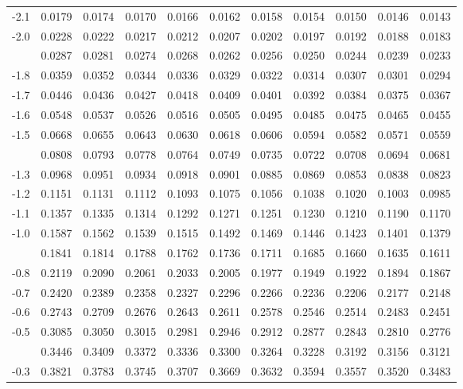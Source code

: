 \documentclass[12pt,a4paper]{article}
\begin{document}
\begin{enumerate}
\begin{center}
\begin{longtable}{ccccccccccc}
-2.1 & 0.0179 & 0.0174 & 0.0170 & 0.0166 & 0.0162 & 0.0158 & 0.0154 & 0.0150 & 0.0146 & 0.0143 \\
-2.0 & 0.0228 & 0.0222 & 0.0217 & 0.0212 & 0.0207 & 0.0202 & 0.0197 & 0.0192 & 0.0188 & 0.0183 \\
\addlinespace
-1.9 & 0.0287 & 0.0281 & 0.0274 & 0.0268 & 0.0262 & 0.0256 & 0.0250 & 0.0244 & 0.0239 & 0.0233 \\
-1.8 & 0.0359 & 0.0352 & 0.0344 & 0.0336 & 0.0329 & 0.0322 & 0.0314 & 0.0307 & 0.0301 & 0.0294 \\
-1.7 & 0.0446 & 0.0436 & 0.0427 & 0.0418 & 0.0409 & 0.0401 & 0.0392 & 0.0384 & 0.0375 & 0.0367 \\
-1.6 & 0.0548 & 0.0537 & 0.0526 & 0.0516 & 0.0505 & 0.0495 & 0.0485 & 0.0475 & 0.0465 & 0.0455 \\
-1.5 & 0.0668 & 0.0655 & 0.0643 & 0.0630 & 0.0618 & 0.0606 & 0.0594 & 0.0582 & 0.0571 & 0.0559 \\
\addlinespace
-1.4 & 0.0808 & 0.0793 & 0.0778 & 0.0764 & 0.0749 & 0.0735 & 0.0722 & 0.0708 & 0.0694 & 0.0681 \\
-1.3 & 0.0968 & 0.0951 & 0.0934 & 0.0918 & 0.0901 & 0.0885 & 0.0869 & 0.0853 & 0.0838 & 0.0823 \\
-1.2 & 0.1151 & 0.1131 & 0.1112 & 0.1093 & 0.1075 & 0.1056 & 0.1038 & 0.1020 & 0.1003 & 0.0985 \\
-1.1 & 0.1357 & 0.1335 & 0.1314 & 0.1292 & 0.1271 & 0.1251 & 0.1230 & 0.1210 & 0.1190 & 0.1170 \\
-1.0 & 0.1587 & 0.1562 & 0.1539 & 0.1515 & 0.1492 & 0.1469 & 0.1446 & 0.1423 & 0.1401 & 0.1379 \\
\addlinespace
-0.9 & 0.1841 & 0.1814 & 0.1788 & 0.1762 & 0.1736 & 0.1711 & 0.1685 & 0.1660 & 0.1635 & 0.1611 \\
-0.8 & 0.2119 & 0.2090 & 0.2061 & 0.2033 & 0.2005 & 0.1977 & 0.1949 & 0.1922 & 0.1894 & 0.1867 \\
-0.7 & 0.2420 & 0.2389 & 0.2358 & 0.2327 & 0.2296 & 0.2266 & 0.2236 & 0.2206 & 0.2177 & 0.2148 \\
-0.6 & 0.2743 & 0.2709 & 0.2676 & 0.2643 & 0.2611 & 0.2578 & 0.2546 & 0.2514 & 0.2483 & 0.2451 \\
-0.5 & 0.3085 & 0.3050 & 0.3015 & 0.2981 & 0.2946 & 0.2912 & 0.2877 & 0.2843 & 0.2810 & 0.2776 \\
\addlinespace
-0.4 & 0.3446 & 0.3409 & 0.3372 & 0.3336 & 0.3300 & 0.3264 & 0.3228 & 0.3192 & 0.3156 & 0.3121 \\
-0.3 & 0.3821 & 0.3783 & 0.3745 & 0.3707 & 0.3669 & 0.3632 & 0.3594 & 0.3557 & 0.3520 & 0.3483 \\

\end{longtable}
\end{center}
\end{enumerate}
\end{document}
